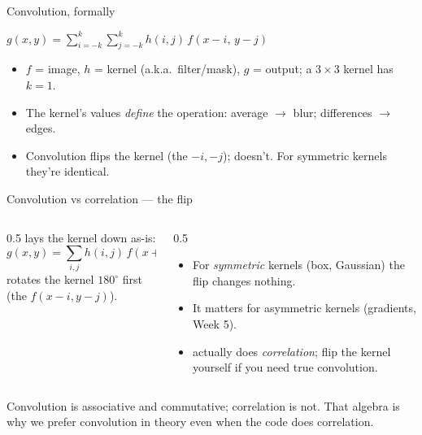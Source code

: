 \documentclass[10pt,aspectratio=169]{beamer}
\begin{document}
\begin{frame}{Convolution, formally}
  \begin{mathbox}
    $g(x,y) = \displaystyle\sum_{i=-k}^{k}\sum_{j=-k}^{k} h(i,j)\, f(x-i,\,y-j)$
  \end{mathbox}
  \begin{itemize}
    \item $f$ = image, $h$ = kernel (a.k.a.\ filter/mask), $g$ = output; a $3\times3$ kernel has $k=1$.
    \item The kernel's values \emph{define} the operation: average $\rightarrow$ blur; differences $\rightarrow$ edges.
    \item Convolution flips the kernel (the $-i,-j$);  doesn't. For symmetric kernels they're identical.
  \end{itemize}
\end{frame}

\begin{frame}{Convolution vs correlation — the flip}
  \begin{columns}[T]
    \begin{column}{0.5\textwidth}
       lays the kernel down as-is:
      \[ g(x,y)=\sum_{i,j} h(i,j)\,f(x{+}i,\,y{+}j) \]
       rotates the kernel $180^\circ$ first (the $f(x{-}i,y{-}j)$).
    \end{column}
    \begin{column}{0.5\textwidth}
      \begin{itemize}
        \item For \emph{symmetric} kernels (box, Gaussian) the flip changes nothing.
        \item It matters for asymmetric kernels (gradients, Week 5).
        \item {} actually does \emph{correlation}; flip the kernel yourself if you need true convolution.
      \end{itemize}
    \end{column}
  \end{columns}
  \begin{infobox}
    Convolution is associative and commutative; correlation is not. That algebra is why we
    prefer convolution in theory even when the code does correlation.
  \end{infobox}
\end{frame}
\end{document}
